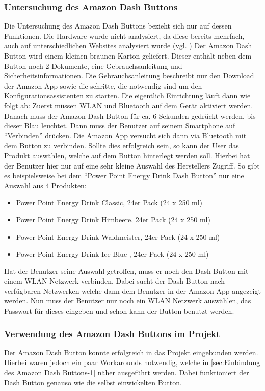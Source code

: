 \subsubsection{Untersuchung des Amazon Dash Buttons}
\label{sec:Untersuchung des Amazon Dash Buttons}
Die Untersuchung des Amazon Dash Buttons bezieht sich nur auf dessen Funktionen.
Die Hardware wurde nicht analysiert, da diese bereits mehrfach, auch auf unterschiedlichen Websites analysiert wurde (vgl. \cite{.17.05.2017}\cite{.17.05.2017b})
Der Amazon Dash Button wird einem kleinen braunen Karton geliefert.
Dieser enthält neben dem Button noch 2 Dokumente, eine Gebrauchsanleitung und Sicherheitsinformationen.
Die Gebrauchsanleitung beschreibt nur den Download der Amazon App sowie die schritte, die notwendig sind um den Konfigurationsassistenten zu starten.
Die eigentlich Einrichtung läuft dann wie folgt ab:
Zuerst müssen WLAN und Bluetooth auf dem Gerät aktiviert werden.
Danach muss der Amazon Dash Button für ca. 6 Sekunden gedrückt werden, bis dieser Blau leuchtet.
Dann muss der Benutzer auf seinem Smartphone auf "`Verbinden"' drücken.
Die Amazon App versucht sich dann via Bluetooth mit dem Button zu verbinden.
Sollte dies erfolgreich sein, so kann der User das  Produkt auswählen, welche auf dem Button hinterlegt werden soll.
Hierbei hat der Benutzer hier nur auf eine sehr kleine Auswahl des Herstellers Zugriff.
So gibt es beispielsweise bei dem "`Power Point Energy Drink Dash Button"' nur eine Auswahl aus 4 Produkten:
\begin{itemize}
\item Power Point Energy Drink Classic, 24er Pack (24 x 250 ml)
\item Power Point Energy Drink Himbeere, 24er Pack (24 x 250 ml)
\item Power Point Energy Drink Waldmeister, 24er Pack (24 x 250 ml)
\item Power Point Energy Drink Ice Blue , 24er Pack (24 x 250 ml) 
\end{itemize}
Hat der Benutzer seine Auswahl getroffen, muss er noch den Dash Button mit einem WLAN Netzwerk verbinden.
Dabei sucht der Dash Button nach verfügbaren Netzwerken welche dann dem Benutzer in der Amazon App angezeigt werden.
Nun muss der Benutzer nur noch ein WLAN Netzwerk auswählen, das Passwort für dieses eingeben und schon kann der Button benutzt werden.

\subsubsection{Verwendung des Amazon Dash Buttons im Projekt}
\label{sec:Verwendung des Amazon Dash Buttons im Projekt}
Der Amazon Dash Button konnte erfolgreich in das Projekt eingebunden werden. Hierbei waren jedoch ein paar Workarounds notwendig, welche in \ref{sec:Einbindung des Amazon Dash Buttons-1} näher ausgeführt werden. Dabei funktioniert der Dash Button genauso wie die selbst einwickelten Button.